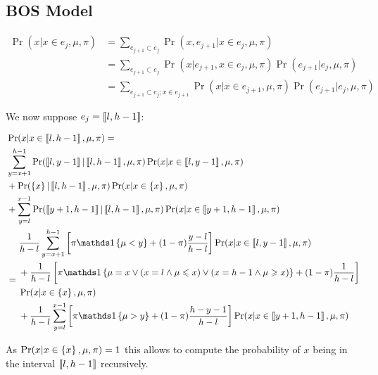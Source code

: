 \subsection{BOS Model}

\begin{align}
    \Pr(x | x \in e_j, \mu, \pi) 
    &= \sum_{e_{j+1} \subset e_j} \Pr(x, e_{j+1} | x \in e_j, \mu, \pi) \\
    &= \sum_{e_{j+1} \subset e_j} \Pr(x | e_{j+1}, x \in e_j, \mu, \pi) \Pr(e_{j+1} | e_j, \mu, \pi) \\
    &= \sum_{e_{j+1} \subset e_j ; x\in e_{j+1}} \Pr(x | x \in e_{j+1}, \mu, \pi) \Pr(e_{j+1} | e_j, \mu, \pi)
\end{align}

We now suppose $e_j = \left\llbracket l, h - 1\right\rrbracket$:

\begin{align}
    &\Pr(x | x \in \bbrack{l, h-1}, \mu, \pi) =\\
    &\begin{aligned}
        &\sum_{y=x + 1}^{h-1} \Pr(\bbrack{l, y - 1} | \bbrack{l, h-1}, \mu, \pi) \Pr(x | x \in \bbrack{l, y - 1}, \mu, \pi) \\
        &+ \Pr(\set{x} | \bbrack{l, h-1}, \mu, \pi) \Pr(x | x \in \set{x}, \mu, \pi) \\
        &+ \sum_{y=l}^{x - 1} \Pr(\bbrack{y + 1, h-1} | \bbrack{l, h-1}, \mu, \pi) \Pr(x | x \in \bbrack{y + 1, h-1}, \mu, \pi)
    \end{aligned} \\
    &= \begin{aligned}
        &\frac{1}{h - l} \sum_{y=x + 1}^{h-1} \left[ \pi \indickronecker{\mu < y} + (1-\pi) \frac{y - l}{h - l} \right] \Pr(x | x \in \bbrack{l, y - 1}, \mu, \pi) \\
        &+\frac{1}{h - l} \left[ \pi \indickronecker{\mu = x \lor (x = l \land \mu \leq x) \lor (x = h - 1 \land \mu \geq x)} + (1 - \pi) \frac{1}{h-l} \right] \\
        &\Pr(x | x \in \set{x}, \mu, \pi) \\
        &+\frac{1}{h - l} \sum_{y=l}^{x - 1} \left[ \pi \indickronecker{\mu > y} + (1-\pi) \frac{h - y - 1}{h - l} \right] \Pr(x | x \in \bbrack{y + 1, h-1}, \mu, \pi)
    \end{aligned}
\end{align}

As $\Pr(x | x \in \left\{ x \right\}, \mu, \pi) = 1$ this allows to compute the probability of $x$ being in the interval $\left\llbracket l, h-1\right\rrbracket$ recursively.

